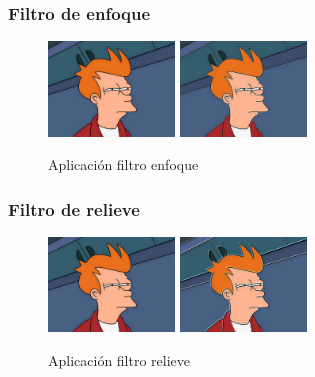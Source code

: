 \subsubsection{Filtro de enfoque}
\vskip0.3cm
\begin{figure}[H]
 \centering
  \includegraphics[width=0.3\textwidth]{imagenes/Fry.jpg}
  \includegraphics[width=0.3\textwidth]{imagenes/fryEnfoque.jpg}
 \caption{Aplicación filtro enfoque}
 \label{diseño}
\end{figure}
\subsubsection{Filtro de relieve}
\vskip0.3cm
\begin{figure}[H]
 \centering
  \includegraphics[width=0.3\textwidth]{imagenes/Fry.jpg}
  \includegraphics[width=0.3\textwidth]{imagenes/fryRelieve.jpg}
 \caption{Aplicación filtro relieve}
 \label{diseño}
\end{figure}
